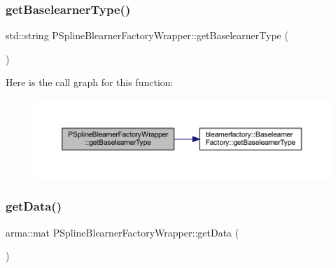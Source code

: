 \subsubsection{\texorpdfstring{get\+Baselearner\+Type()}{getBaselearnerType()}}
{\footnotesize\ttfamily std\+::string P\+Spline\+Blearner\+Factory\+Wrapper\+::get\+Baselearner\+Type (\begin{DoxyParamCaption}{ }\end{DoxyParamCaption})\hspace{0.3cm}{\ttfamily [inline]}}

Here is the call graph for this function\+:\nopagebreak
\begin{figure}[H]
\begin{center}
\leavevmode
\includegraphics[width=350pt]{class_p_spline_blearner_factory_wrapper_a13ca216f7c9673bb66598c9be0e44b03_cgraph}
\end{center}
\end{figure}
\mbox{\label{class_p_spline_blearner_factory_wrapper_a7613c56ca05f36f8365a1d5987bbf823}} 
\subsubsection{\texorpdfstring{get\+Data()}{getData()}}
{\footnotesize\ttfamily arma\+::mat P\+Spline\+Blearner\+Factory\+Wrapper\+::get\+Data (\begin{DoxyParamCaption}{ }\end{DoxyParamCaption})\hspace{0.3cm}{\ttfamily [inline]}}

